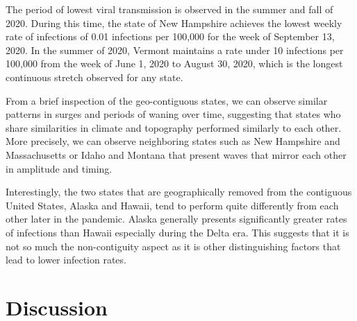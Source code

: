 \documentclass{article}
\newcommand{\attn }[1]{\textcolor{red}{ATTN: #1}}
\begin{document}
The period of lowest viral transmission is observed in the summer and fall of
2020. During this time, the state of New Hampshire achieves the lowest weekly
rate of infections of 0.01 infections per 100,000 for the week of September 13,
2020. In the summer of 2020, Vermont maintains a rate under 10 infections per
100,000 from the week of June 1, 2020 to August 30, 2020, which is the longest
continuous stretch observed for any state.

From a brief inspection of the geo-contiguous states, we can observe similar
patterns in surges and periods of waning over time, suggesting that states who
share similarities in climate and topography performed similarly to each other.
More precisely, we can observe neighboring states such as New Hampshire and
Massachusetts or Idaho and Montana that present waves that mirror each other in
amplitude and timing. 

Interestingly, the two states that are geographically removed from the
contiguous United States, Alaska and Hawaii, tend to perform quite differently
from each other later in the pandemic. Alaska generally presents significantly
greater rates of infections than Hawaii especially during the Delta era. This
suggests that it is not so much the non-contiguity aspect as it is other
distinguishing factors that lead to lower infection rates.



\section{Discussion}
\end{document}
